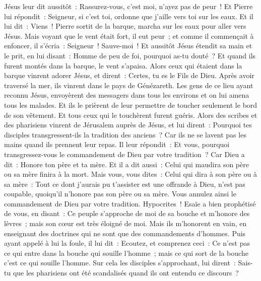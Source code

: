 \begin{multicols}{2}
Jésus leur dit aussitôt~: Rassurez-vous, c'est moi, n'ayez pas de peur~!
Et Pierre lui répondit~: Seigneur, si c'est toi, ordonne que j'aille vers toi sur les eaux.
Et il lui dit~: Viens~! Pierre sortit de la barque, marcha sur les eaux pour aller vers Jésus.
Mais voyant que le vent était fort, il eut peur~; et comme il commençait à enfoncer, il s'écria~: Seigneur~! Sauve-moi~!
Et aussitôt Jésus étendit sa main et le prit, en lui disant~: Homme de peu de foi, pourquoi as-tu douté~?
Et quand ils furent montés dans la barque, le vent s'apaisa.
Alors ceux qui étaient dans la barque vinrent adorer Jésus, et dirent~: Certes, tu es le Fils de Dieu.
Après avoir traversé la mer, ils vinrent dans le pays de Génézareth.
Les gens de ce lieu ayant reconnu Jésus, envoyèrent des messagers dans tous les environs et on lui amena tous les malades.
Et ils le prièrent de leur permettre de toucher seulement le bord de son vêtement. Et tous ceux qui le touchèrent furent guéris.
\VerseOne{}Alors des scribes et des pharisiens vinrent de Jérusalem auprès de Jésus, et lui dirent~:
Pourquoi tes disciples transgressent-ils la tradition des anciens~? Car ils ne se lavent pas les mains quand ils prennent leur repas.
Il leur répondit~: Et vous, pourquoi transgressez-vous le commandement de Dieu par votre tradition~?
Car Dieu a dit~: Honore ton père et ta mère. Et il a dit aussi~: Celui qui maudira son père ou sa mère finira à la mort.
Mais vous, vous dites~: Celui qui dira à son père ou à sa mère~: Tout ce dont j'aurais pu t'assister est une offrande à Dieu, n'est pas coupable, quoiqu'il n'honore pas son père ou sa mère.
Vous annulez ainsi le commandement de Dieu par votre tradition.
Hypocrites~! Esaïe a bien prophétisé de vous, en disant~:
Ce peuple s'approche de moi de sa bouche et m'honore des lèvres~; mais son cœur est très éloigné de moi.
Mais ils m'honorent en vain, en enseignant des doctrines qui ne sont que des commandements d'hommes.
Puis ayant appelé à lui la foule, il lui dit~: Ecoutez, et comprenez ceci~:
Ce n'est pas ce qui entre dans la bouche qui souille l'homme~; mais ce qui sort de la bouche c'est ce qui souille l'homme.
Sur cela les disciples s'approchant, lui dirent~: Sais-tu que les pharisiens ont été scandalisés quand ils ont entendu ce discours~?

\end{multicols}
